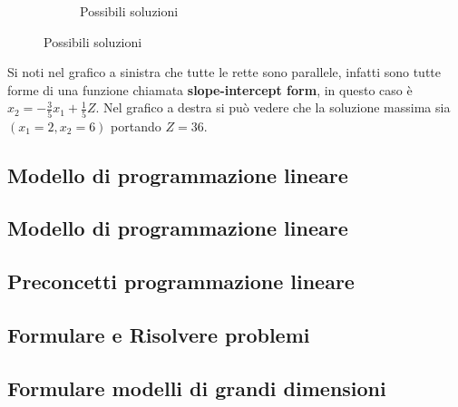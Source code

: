 \documentclass{article}
\begin{document}
\begin{figure}[ht]
\begin{subfigure}[b]{0.50\textwidth}
          \caption{Possibili soluzioni}
        \end{subfigure}

      \end{figure}

      Si noti nel grafico a sinistra che tutte le rette sono parallele, infatti sono tutte forme di una funzione chiamata \textbf{slope-intercept form}, in questo caso è $x_2=-\frac{3}{5}x_1+\frac{1}{5}Z$. Nel grafico a destra si può vedere che la soluzione massima sia $(x_1=2,x_2=6)$ portando $Z=36$.

    \subsection{Modello di programmazione lineare}
  \subsection{Modello di programmazione lineare}
  \subsection{Preconcetti programmazione lineare}
  \subsection{Formulare e Risolvere problemi}
  \subsection{Formulare modelli di grandi dimensioni}
\end{document}
